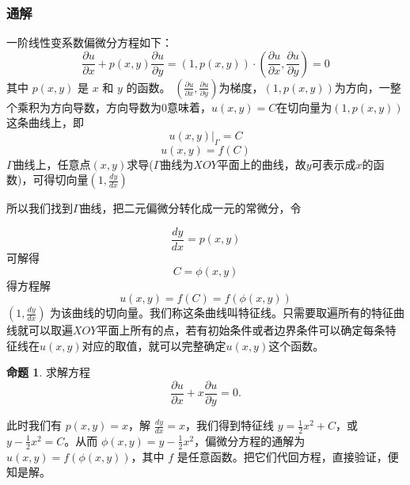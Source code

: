 \documentclass[12pt,a4paper]{article}
\numberwithin{subsection}{section}   %
\numberwithin{subsubsection}{subsection}
\theoremstyle{plain}
\theoremstyle{definition}
\newtheorem{example}{命题}[subsection]  %
\theoremstyle{remark}
\theoremstyle{remark}
\begin{document}
	\subsubsection{通解} 
	一阶线性变系数偏微分方程如下：
	\begin{equation}\label{eq:pde_original2}
		\frac{\partial u}{\partial x} + p(x,y) \frac{\partial u}{\partial y}=(1, p(x, y)) \cdot \left( \frac{\partial u}{\partial x}, \frac{\partial u}{\partial y} \right) = 0 
	\end{equation}
	其中 $p(x, y)$ 是 $x$ 和 $y$ 的函数。
	$\left( \frac{\partial u}{\partial x}, \frac{\partial u}{\partial y} \right)$为梯度，$(1, p(x, y))$为方向，一整个乘积为方向导数，方向导数为0意味着，$u(x, y)=C$在切向量为$(1, p(x, y))$这条曲线上，即
	\begin{equation}
		u(x,y)|_{\Gamma} = C
	\end{equation}
	\begin{equation}
		u(x,y) =  f(C)
	\end{equation}
	$\Gamma$曲线上，任意点$(x, y)$求导($\Gamma$曲线为$XOY$平面上的曲线，故$y$可表示成$x$的函数)，可得切向量$(1,\frac{dy}{dx})$
	
	所以我们找到$\Gamma$曲线，把二元偏微分转化成一元的常微分，令
	
	\begin{equation}
		\frac{dy}{dx} = p(x, y)
	\end{equation}
	可解得
	\begin{equation}
		C=\phi(x,y)
	\end{equation}
	得方程解
	\begin{equation}
		u(x, y)=f(C)=f(\phi(x,y))
	\end{equation}
	$(1, \frac{dy}{dx})$
	为该曲线的切向量。我们称这条曲线叫特征线。只需要取遍所有的特征曲线就可以取遍$XOY$平面上所有的点，若有初始条件或者边界条件可以确定每条特征线在$u(x, y)$对应的取值，就可以完整确定$u(x, y)$这个函数。
	
	\begin{example}求解方程
		\begin{equation}
			\frac{\partial u}{\partial x} + x \frac{\partial u}{\partial y} = 0.
		\end{equation}
		
		此时我们有 $p(x, y) = x$，解 $\frac{dy}{dx} = x$，我们得到特征线 $y = \frac{1}{2}x^2 + C$，或 $y - \frac{1}{2}x^2 = C$。从而 $\phi(x, y) = y - \frac{1}{2}x^2$，偏微分方程的通解为 $u(x, y) = f(\phi(x, y))$，其中 $f$ 是任意函数。把它们代回方程，直接验证，便知是解。
	\end{example}
	
\end{document}
